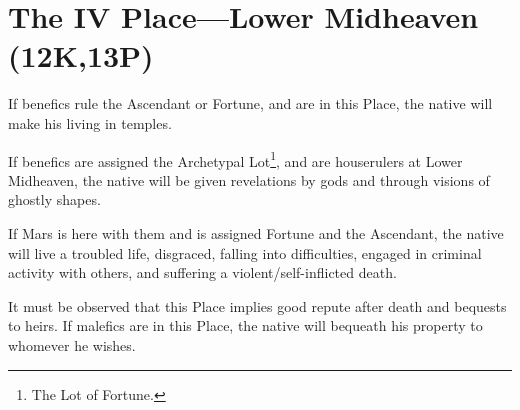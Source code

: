 \section{The IV Place---Lower Midheaven (12K,13P)}
If benefics rule the Ascendant or Fortune, and are in this Place, the native will make his living in temples. 

If benefics are assigned the Archetypal Lot\footnote{The Lot of Fortune.}, and are houserulers at Lower Midheaven, the native will be given revelations by gods and through visions of ghostly shapes. 

If Mars is here with them and is assigned Fortune and the Ascendant, the native will live a troubled life, disgraced, falling into difficulties,
engaged in criminal activity with others, and suffering a violent/self-inflicted death.

It must be observed that this Place implies good repute after death and bequests to heirs. If malefics are in this Place, the native will bequeath his property to whomever he wishes.

\newpage